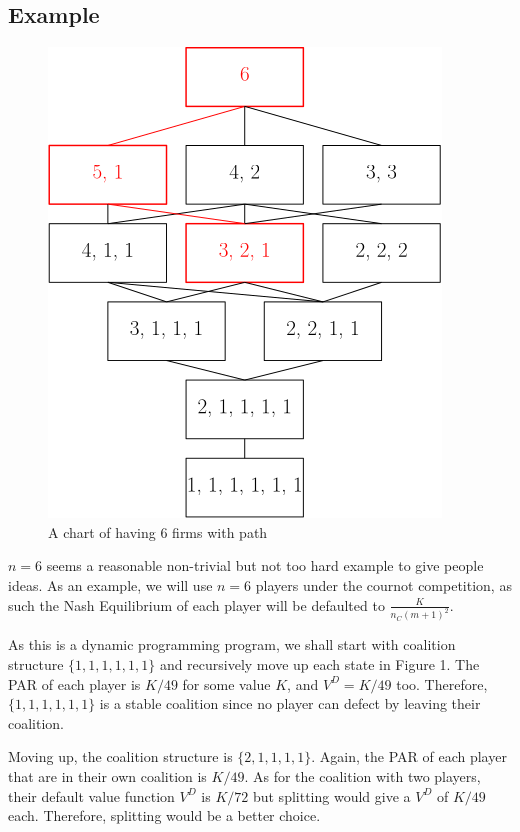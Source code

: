 \documentclass[sigconf,anonymous]{aamas}
\newcommand{\ykc}[1]{{\color{blue} #1}}
\begin{document}
\subsection{Example}

\begin{figure}[h]
	\includegraphics[width=0.8\linewidth]{images/6_firms_with_path.png}
	\caption{A chart of having 6 firms with path }
\end{figure}

\ykc{$n=6$ seems a reasonable non-trivial but not too hard example to give people ideas.}
As an example, we will use $n=6$ players under the cournot competition, as such the Nash Equilibrium of each player will be defaulted to $\frac{K}{n_C(m+1)^2}$. 

As this is a dynamic programming program, we shall start with coalition structure $\{1, 1, 1, 1, 1, 1\}$ and recursively move up each state in Figure 1. The PAR of each player is $K/49$ for some value $K$, and $V^D = K/49$ too. Therefore, $\{1, 1, 1, 1, 1, 1\}$ is a stable coalition since no player can defect by leaving their coalition. 

Moving up, the coalition structure is $\{2, 1, 1, 1, 1\}$. Again, the PAR of each player that are in their own coalition is $K/49$. As for the coalition with two players, their default value function $V^D$ is $K/72$ but splitting would give a $V^D$ of $K/49$ each. Therefore, splitting would be a better choice. 
\end{document}
